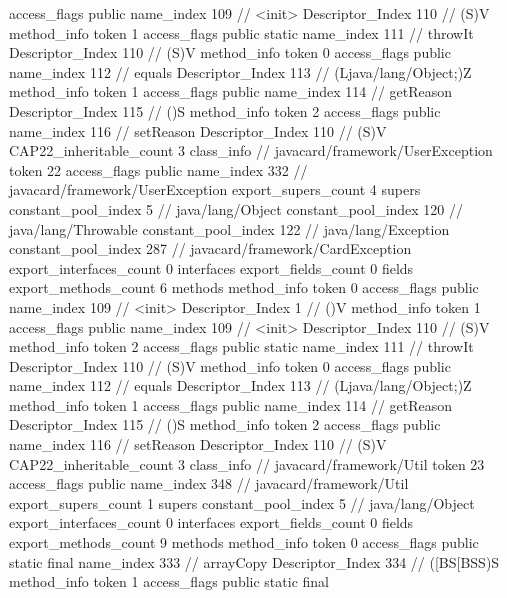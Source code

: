 {{{{{					access_flags	public
					name_index	109		// <init>
					Descriptor_Index	110		// (S)V
				}
				method_info {
					token	1
					access_flags	public static
					name_index	111		// throwIt
					Descriptor_Index	110		// (S)V
				}
				method_info {
					token	0
					access_flags	public
					name_index	112		// equals
					Descriptor_Index	113		// (Ljava/lang/Object;)Z
				}
				method_info {
					token	1
					access_flags	public
					name_index	114		// getReason
					Descriptor_Index	115		// ()S
				}
				method_info {
					token	2
					access_flags	public
					name_index	116		// setReason
					Descriptor_Index	110		// (S)V
				}
			}
			CAP22_inheritable_count	3
		}
		class_info {		// javacard/framework/UserException
			token	22
			access_flags	public
			name_index	332		// javacard/framework/UserException
			export_supers_count	4
			supers {
				constant_pool_index	5		// java/lang/Object
				constant_pool_index	120		// java/lang/Throwable
				constant_pool_index	122		// java/lang/Exception
				constant_pool_index	287		// javacard/framework/CardException
			}
			export_interfaces_count	0
			interfaces {
			}
			export_fields_count	0
			fields {
			}
			export_methods_count	6
			methods {
				method_info {
					token	0
					access_flags	public
					name_index	109		// <init>
					Descriptor_Index	1		// ()V
				}
				method_info {
					token	1
					access_flags	public
					name_index	109		// <init>
					Descriptor_Index	110		// (S)V
				}
				method_info {
					token	2
					access_flags	public static
					name_index	111		// throwIt
					Descriptor_Index	110		// (S)V
				}
				method_info {
					token	0
					access_flags	public
					name_index	112		// equals
					Descriptor_Index	113		// (Ljava/lang/Object;)Z
				}
				method_info {
					token	1
					access_flags	public
					name_index	114		// getReason
					Descriptor_Index	115		// ()S
				}
				method_info {
					token	2
					access_flags	public
					name_index	116		// setReason
					Descriptor_Index	110		// (S)V
				}
			}
			CAP22_inheritable_count	3
		}
		class_info {		// javacard/framework/Util
			token	23
			access_flags	public
			name_index	348		// javacard/framework/Util
			export_supers_count	1
			supers {
				constant_pool_index	5		// java/lang/Object
			}
			export_interfaces_count	0
			interfaces {
			}
			export_fields_count	0
			fields {
			}
			export_methods_count	9
			methods {
				method_info {
					token	0
					access_flags	public static final
					name_index	333		// arrayCopy
					Descriptor_Index	334		// ([BS[BSS)S
				}
				method_info {
					token	1
					access_flags	public static final
}}}}}

